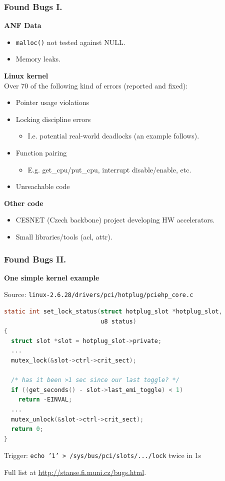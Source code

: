 \documentclass[xcolor=dvipsnames]{beamer}
\newcommand{\heading}[1]{\textbf{\textcolor{BurntOrange}{#1}}}
\begin{document}
\begin{frame}
  \frametitle{Found Bugs I.}
  
  \heading{ANF Data}
  \begin{itemize}
  \item \texttt{malloc()} not tested against NULL.
  \item Memory leaks.
  \end{itemize}

  \pause
  \medskip

  \heading{Linux kernel}\\
  Over 70 of the following kind of errors (reported and fixed):
  \begin{itemize}
  \item Pointer usage violations
  \item Locking discipline errors
    \begin{itemize}
    \item I.e. potential real-world deadlocks (an example follows).
    \end{itemize}
  \item Function pairing
    \begin{itemize}
    \item E.g. get\_cpu/put\_cpu, interrupt disable/enable, etc.
    \end{itemize}
  \item Unreachable code
  \end{itemize}

  \pause
  \medskip

  \heading{Other code}
  \begin{itemize}
  \item CESNET (Czech backbone) project developing HW accelerators.
  \item Small libraries/tools (acl, attr).
  \end{itemize}
\end{frame}

\begin{frame}[fragile]
  \frametitle{Found Bugs II.}

  \heading{One simple kernel example}

  Source: \texttt{\small linux-2.6.28/drivers/pci/hotplug/pciehp\_core.c}
  \begin{lstlisting}[language=C]
static int set_lock_status(struct hotplug_slot *hotplug_slot,
                           u8 status)
{
  struct slot *slot = hotplug_slot->private;
  ...
  mutex_lock(&slot->ctrl->crit_sect);

  /* has it been >1 sec since our last toggle? */
  if ((get_seconds() - slot->last_emi_toggle) < 1)
    return -EINVAL;
  ...
  mutex_unlock(&slot->ctrl->crit_sect);
  return 0;
}
  \end{lstlisting}

  Trigger: \texttt{\small echo '1' > /sys/bus/pci/slots/.../lock} twice in 1s

  \pause
  \medskip
  Full list at \url{http://stanse.fi.muni.cz/bugs.html}.

\end{frame}
\end{document}
